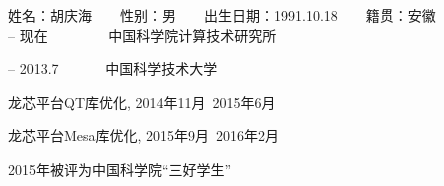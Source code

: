 \begin{resume}

\noindent
姓名：胡庆海　　性别：男　　出生日期：1991.10.18　　籍贯：安徽\\

 -- 现在　　　　  中国科学院计算技术研究所

 -- 2013.7　　　  中国科学技术大学\\

  \begin{enumerate}[{[}1{]}]
  \item 龙芯平台QT库优化, 2014年11月~2015年6月
  \item 龙芯平台Mesa库优化, 2015年9月~2016年2月 
  \end{enumerate}

  \begin{enumerate}[{[}1{]}]
  \item  2015年被评为中国科学院“三好学生”
  \end{enumerate}
\end{resume}
